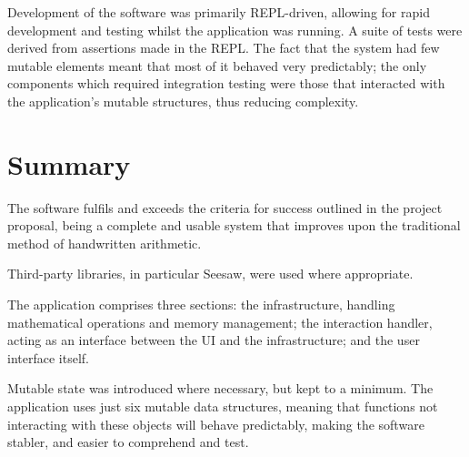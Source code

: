 \documentclass[12pt,twoside,notitlepage,xetex]{report}
\begin{document}
{Development of the software was primarily REPL-driven, allowing for rapid development and testing whilst the application was running.  A suite of tests were derived from assertions made in the REPL.  The fact that the system had few mutable elements meant that most of it behaved very predictably; the only components which required integration testing were those that interacted with the application's mutable structures, thus reducing complexity.%
%
%

\section{Summary}

The software fulfils and exceeds the criteria for success outlined in the project proposal, being a complete and usable system that improves upon the traditional method of handwritten arithmetic.

Third-party libraries, in particular Seesaw, were used where appropriate.

The application comprises three sections: the infrastructure, handling mathematical operations and memory management; the interaction handler, acting as an interface between the UI and the infrastructure; and the user interface itself.

Mutable state was introduced where necessary, but kept to a minimum.  The application uses just six mutable data structures, meaning that functions not interacting with these objects will behave predictably, making the software stabler, and easier to comprehend and test.

}
\end{document}
